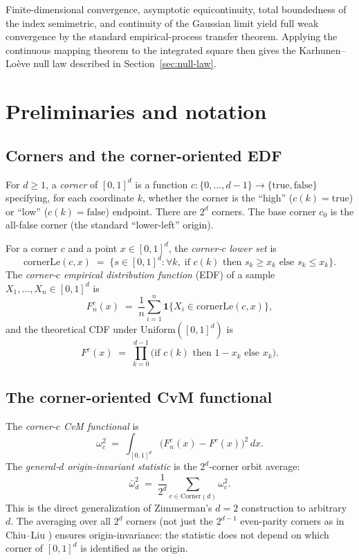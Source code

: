 \documentclass[pdflatex]{sn-jnl}
\theoremstyle{thmstyleone}
\theoremstyle{thmstyletwo}
\theoremstyle{thmstylethree}
\begin{document}
Finite-dimensional convergence, asymptotic equicontinuity, total boundedness of the index semimetric, and continuity of the Gaussian limit yield full weak convergence by the standard empirical-process transfer theorem. Applying the continuous mapping theorem to the integrated square then gives the Karhunen--Lo\`eve null law described in Section~\ref{sec:null-law}.

\section{Preliminaries and notation}\label{sec:prelim}

\subsection{Corners and the corner-oriented EDF}\label{sec:corners}

For $d\ge 1$, a \emph{corner} of $[0,1]^d$ is a function $c : \{0,\dots,d-1\} \to \{\mathrm{true},\mathrm{false}\}$ specifying, for each coordinate $k$, whether the corner is the ``high'' ($c(k)=\mathrm{true}$) or ``low'' ($c(k)=\mathrm{false}$) endpoint. There are $2^d$ corners. The base corner $c_0$ is the all-false corner (the standard ``lower-left'' origin).

For a corner $c$ and a point $x\in[0,1]^d$, the \emph{corner-$c$ lower set} is
\[
  \mathrm{cornerLe}(c, x) \;=\; \{s\in[0,1]^d : \forall k,\; \text{if } c(k) \text{ then } s_k \ge x_k \text{ else } s_k \le x_k\}.
\]
The \emph{corner-$c$ empirical distribution function} (EDF) of a sample $X_1,\dots,X_n\in[0,1]^d$ is
\[
  F_n^c(x) \;=\; \frac{1}{n}\sum_{i=1}^n \mathbf{1}\{X_i \in \mathrm{cornerLe}(c,x)\},
\]
and the theoretical CDF under $\mathrm{Uniform}([0,1]^d)$ is
\[
  F^c(x) \;=\; \prod_{k=0}^{d-1} \bigl(\text{if } c(k) \text{ then } 1-x_k \text{ else } x_k\bigr).
\]

\subsection{The corner-oriented CvM functional}\label{sec:cvm-corner}

The \emph{corner-$c$ CvM functional} is
\begin{equation}\label{eq:cvmAtCorner}
  \omega^2_c \;=\; \int_{[0,1]^d} \bigl(F_n^c(x) - F^c(x)\bigr)^2\,dx.
\end{equation}
The \emph{general-$d$ origin-invariant statistic} is the $2^d$-corner orbit average:
\begin{equation}\label{eq:omegaBarSqD}
  \bar\omega^2_d \;=\; \frac{1}{2^d}\sum_{c\in\mathrm{Corner}(d)} \omega^2_c.
\end{equation}
This is the direct generalization of Zimmerman's $d=2$ construction \cite{Zimmerman1993} to arbitrary $d$. The averaging over all $2^d$ corners (not just the $2^{d-1}$ even-parity corners as in Chiu--Liu \cite{ChiuLiu2009}) ensures origin-invariance: the statistic does not depend on which corner of $[0,1]^d$ is identified as the origin.
\end{document}

